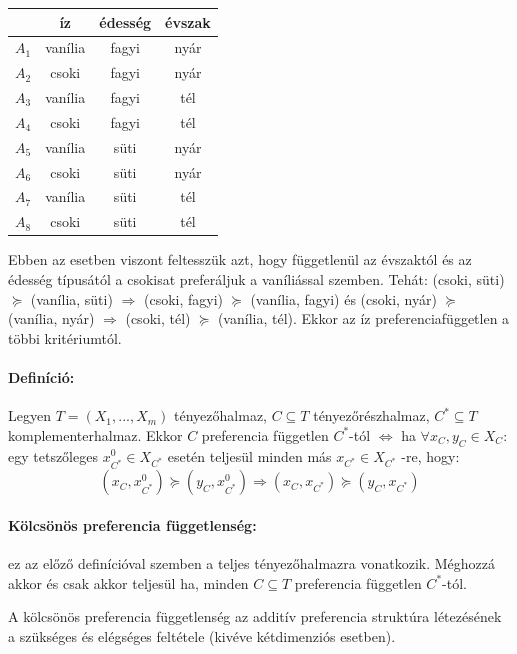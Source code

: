 \documentclass[a4paper,12pt]{article}
\begin{document}
\begin{center}
\begin{tabular}{c||c|c|c}
 & íz& édesség& évszak \\
 \hline
 $A_1$& vanília  & fagyi & nyár \\
 $A_2$& csoki  & fagyi & nyár \\
 $A_3$& vanília  & fagyi & tél \\
 $A_4$& csoki  & fagyi & tél \\
 $A_5$& vanília  & süti & nyár \\
 $A_6$& csoki  & süti & nyár \\
 $A_7$& vanília  & süti & tél \\
 $A_8$& csoki  & süti & tél \\
\end{tabular}
\end{center}

Ebben az esetben viszont feltesszük azt, hogy függetlenül az évszaktól és az édesség típusától a csokisat preferáljuk a vaníliással szemben. Tehát: (csoki, süti) $\succeq$ (vanília, süti) $\Rightarrow$ (csoki, fagyi) $\succeq$ (vanília, fagyi) és (csoki, nyár) $\succeq$ (vanília, nyár) $\Rightarrow$ (csoki, tél) $\succeq$ (vanília, tél). Ekkor az íz preferenciafüggetlen a többi kritériumtól. 


\paragraph{Definíció: } Legyen $T=(X_1,...,X_m)$ tényezőhalmaz, $C \subseteq T$ tényezőrészhalmaz,  $C^* \subseteq T $ komplementerhalmaz. Ekkor $C$ preferencia független $C^*$-tól $\Leftrightarrow$ ha $\forall x_C, y_C \in X_C:$  egy tetszőleges $x_{C^{*}}^0 \in X_{C^*}$  esetén teljesül minden más $ x_{C^{*}} \in X_{C^*}$ -re, hogy:
\begin{equation}
(x_C, x_{C^{*}}^0) \succeq (y_C, x_{C^{*}}^0) 
\Rightarrow
(x_C, x_{C^{*}}) \succeq (y_C, x_{C^{*}}) 
\end{equation}

\paragraph{Kölcsönös preferencia függetlenség: } ez az előző definícióval szemben a teljes tényezőhalmazra vonatkozik. Méghozzá akkor és csak akkor teljesül ha, minden $C \subseteq T$ preferencia független $C^*$-tól.

A kölcsönös preferencia függetlenség az additív preferencia struktúra létezésének a szükséges és elégséges feltétele (kivéve kétdimenziós esetben).
\end{document}
